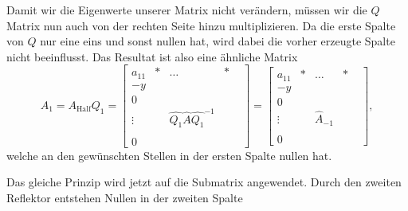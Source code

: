 Damit wir die Eigenwerte unserer Matrix nicht verändern, müssen wir die $Q$ Matrix nun auch von der rechten Seite hinzu multiplizieren.
Da die erste Spalte von $Q$ nur eine eins und sonst nullen hat, wird dabei die vorher erzeugte Spalte nicht beeinflusst.
Das Resultat ist also eine ähnliche Matrix
\begin{equation}
	A_{1}=A_{\text{Half}}Q_{1}=
	\begin{bmatrix}
	a_{11} & * & \dots & *\\
	-y & \\
	0 & & & &\\
	\vdots & &\hat{Q_1}\hat{A}\hat{Q_1}^{-1} &\\
	 & & & &\\
	0 & & & &
	\end{bmatrix}
	=
	\begin{bmatrix}
	a_{11} & * & \dots & *\\
	-y & \\
	0 & & & &\\
	\vdots & &\hat{A}_{-1} &\\
	 & & & &\\
	0 & & & &
	\end{bmatrix},
\end{equation}	
welche an den gewünschten Stellen in der ersten Spalte nullen hat.

Das gleiche Prinzip wird jetzt auf die Submatrix angewendet.
Durch den zweiten Reflektor entstehen Nullen in der zweiten Spalte

